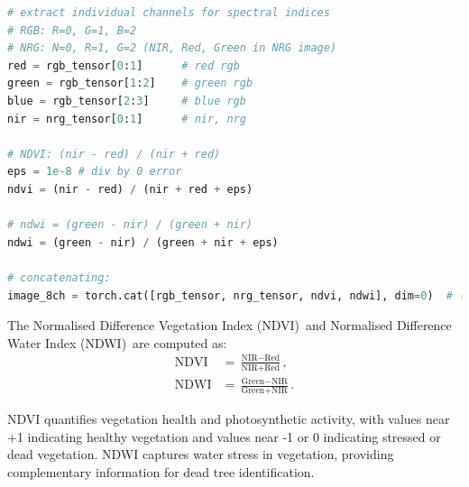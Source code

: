 \begin{lstlisting}[language=Python]
# extract individual channels for spectral indices
# RGB: R=0, G=1, B=2
# NRG: N=0, R=1, G=2 (NIR, Red, Green in NRG image)
red = rgb_tensor[0:1]      # red rgb
green = rgb_tensor[1:2]    # green rgb  
blue = rgb_tensor[2:3]     # blue rgb
nir = nrg_tensor[0:1]      # nir, nrg

# NDVI: (nir - red) / (nir + red)
eps = 1e-8 # div by 0 error
ndvi = (nir - red) / (nir + red + eps)

# ndwi = (green - nir) / (green + nir)  
ndwi = (green - nir) / (green + nir + eps)

# concatenating:
image_8ch = torch.cat([rgb_tensor, nrg_tensor, ndvi, ndwi], dim=0)  # (8, H, W)
\end{lstlisting}

The Normalised Difference Vegetation Index (NDVI)\,\cite{b14} and Normalised Difference Water Index (NDWI)\,\cite{b15} are computed as:
\begin{align}
  \text{NDVI} &= \frac{\text{NIR} - \text{Red}}{\text{NIR} + \text{Red}}, \\
  \text{NDWI} &= \frac{\text{Green} - \text{NIR}}{\text{Green} + \text{NIR}}.
\end{align}

NDVI quantifies vegetation health and photosynthetic activity, with values near +1 indicating healthy vegetation and values near -1 or 0 indicating stressed or dead vegetation. NDWI captures water stress in vegetation, providing complementary information for dead tree identification.

